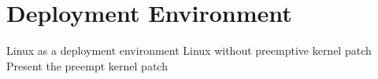 \chapter{Deployment Environment}

Linux as a deployment environment
Linux without preemptive kernel patch
Present the preempt kernel patch


